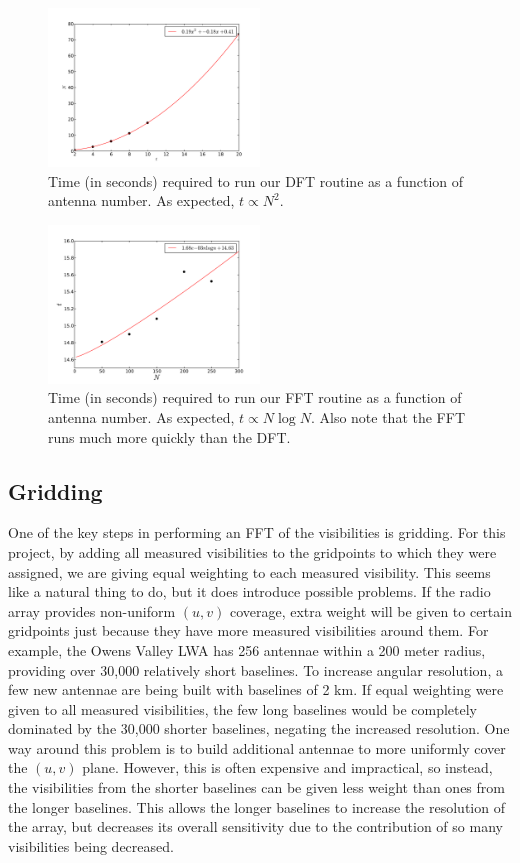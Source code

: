 \documentclass[11pt,letterpaper]{article}
\begin{document}
\begin{figure}[!h]
\centering
\includegraphics[width=0.5\textwidth]{DFT_image_timing.pdf}
\caption{Time (in seconds) required to run our DFT routine as a function of 
antenna number.  As expected, $t\propto N^2$.}
\label{fig:DFTtime}
\end{figure}

\begin{figure}[!h]
\centering
\includegraphics[width=0.5\textwidth]{FFT_image_timing.pdf}
\caption{Time (in seconds) required to run our FFT routine as a function of 
antenna number.  As expected, $t\propto N\log N$.  Also note that the FFT 
runs much more quickly than the DFT.}
\label{fig:FFTtime}
\end{figure}

\subsection{Gridding}
One of the key steps in performing an FFT of the visibilities is gridding.  
For this project, by adding all measured visibilities to the gridpoints 
to which they were assigned, we are giving equal weighting to each 
measured visibility.  This seems like a natural thing to do, but it 
does introduce possible problems.  If the radio array provides 
non-uniform $(u,v)$ coverage, extra weight will be given to 
certain gridpoints just because they have more measured 
visibilities around them.  For example, the Owens Valley LWA 
has 256 antennae within a 200 meter radius, providing over 
30,000 relatively short baselines.  To increase angular 
resolution, a few new antennae are being built with baselines 
of 2 km.  If equal weighting were given to all measured visibilities, 
the few long baselines would be completely dominated by the 30,000 
shorter baselines, negating the increased resolution.  One way around 
this problem is to build additional antennae to more uniformly cover the 
$(u,v)$ plane.  However, this is often expensive and impractical, so instead, 
the visibilities from the shorter baselines can be given less weight than 
ones from the longer baselines.  This allows the longer baselines to 
increase the resolution of the array, but decreases its overall 
sensitivity due to the contribution of so many visibilities being decreased.
\end{document}
